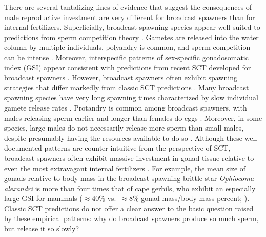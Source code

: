 \documentclass{article}
\begin{document}
There are several tantalizing lines of evidence that suggest the consequences of male reproductive investment are very different for broadcast spawners than for internal fertilizers. Superficially, broadcast spawning species appear well suited to predictions from sperm competition theory \citep{Parker2017}. Gametes are released into the water column by multiple individuals, polyandry is common, and sperm competition can be intense \citep{McEuan1988, Levitan1998,Levitan2002, Levitan2004, Marshall2002}. Moreover, interspecific patterns of sex-specific gonadosomatic index (GSI) appear consistent with predictions from recent SCT developed for broadcast spawners \citep{Parker2017}. However, broadcast spawners often exhibit spawning strategies that differ markedly from classic SCT predictions \citep{BodeMarshall2007, Olito2015, Olito2017}. Many broadcast spawning species have very long spawning times characterized by slow individual gamete release rates \citep{McEuan1988,MarshallBolton2007}. Protandry is common among broadcast spawners, with males releasing sperm earlier and longer than females do eggs \citep{McEuan1988, LotterhosLevitan2011, Levitan2005, MarshallBolton2007}. Moreover, in some species, large males do not necessarily release more sperm than small males, despite presumably having the resources available to do so \citep{Levitan1991, Styan2003}. Although these well documented patterns are counter-intuitive from the perspective of SCT, broadcast spawners often exhibit massive investment in gonad tissue relative to even the most extravagant internal fertilizers \citep{Parker2017}. For example, the mean size of gonads relative to body mass in the broadcast spawning brittle star \textit{Ophiocoma alexandri} is more than four times that of cape gerbils, who exhibit an especially large GSI for mammals ($\approx$40\% vs.~$\approx$8\% gonad mass/body mass percent; \citealt{Kenagy1986, BenitezVillalobos2012}). Classic SCT predictions do not offer a clear answer to the basic question raised by  these empirical patterns: why do broadcast spawners produce so much sperm, but release it so slowly?
\end{document}
